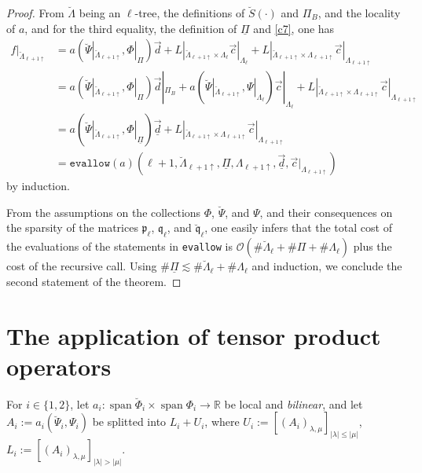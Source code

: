 \documentclass{amsart}
\theoremstyle{definition}
\theoremstyle{remark}
\numberwithin{equation}{section}
\newcommand{\R}{\mathbb R}
\DeclareMathOperator{\Span}{span}
\newcommand{\1}{\mathbb 1}
\begin{document}
\begin{proof}
From  $\breve{\Lambda}$ being an $\ell$-tree, the definitions of $\breve{S}(\cdot)$ and $\Pi_B$, and the locality of $a$, and for the third equality, the definition of $\underline{\Pi}$ and \eqref{c7}, one has
\begin{align*}
f|_{\breve{\Lambda}_{\ell+1 \uparrow}}&=a(\breve{\Psi}|_{\breve{\Lambda}_{\ell+1 \uparrow}},\Phi|_\Pi)\vec{d}
+
L|_{\breve{\Lambda}_{\ell+1 \uparrow} \times \Lambda_\ell}\vec{c}|_{\Lambda_\ell}+
L|_{\breve{\Lambda}_{\ell+1 \uparrow} \times \Lambda_{\ell+1 \uparrow }}\vec{c}|_{\Lambda_{\ell+1\uparrow}}\\
& = a(\breve{\Psi}|_{\breve{\Lambda}_{\ell+1 \uparrow}},\Phi|_\Pi)\vec{d}|_{\Pi_B}+
a(\breve{\Psi}|_{\breve{\Lambda}_{\ell+1 \uparrow}},\Psi|_{\Lambda_\ell})
\vec{c}|_{\Lambda_\ell}+L|_{\breve{\Lambda}_{\ell+1 \uparrow} \times \Lambda_{\ell+1 \uparrow }}\vec{c}|_{\Lambda_{\ell+1\uparrow}}
\\
& = a(\breve{\Psi}|_{\breve{\Lambda}_{\ell+1 \uparrow}},\Phi|_{\underline{\Pi}})\underline{\vec{d}}+L|_{\breve{\Lambda}_{\ell+1 \uparrow} \times \Lambda_{\ell+1 \uparrow }}\vec{c}|_{\Lambda_{\ell+1\uparrow}}\\
& =\mathtt{evallow}(a)(\ell+1, \breve{\Lambda}_{\ell+1\uparrow}, \underline{\Pi}, \Lambda_{\ell+1\uparrow},\underline{\vec{d}}, \vec{c}|_{\Lambda_{\ell+1\uparrow}}) \end{align*}
 by induction.
 
 From the assumptions on the collections $\Phi$, $\breve{\Psi}$, and $\Psi$, and their consequences on the sparsity of the matrices $\mathfrak{p}_{\ell} $, $\mathfrak{q}_\ell$, and $\mathfrak{\breve{q}}_\ell$, one easily infers that the total cost of the evaluations of the statements in \texttt{evallow} is ${\mathcal O}(\# \breve{\Lambda}_\ell+\# \Pi+\# \Lambda_\ell)$ plus the cost of the recursive call. Using 
 $ \# \underline{\Pi} \lesssim \# \breve{\Lambda}_\ell+\# \Lambda_\ell$
 and induction, we conclude the second statement of the theorem.
 \end{proof}

 \newpage
\section{The application of tensor product operators} \label{Sappl-of-tensors}
For $i \in \{1,2\}$, let $a_i\colon \Span \breve{\Phi}_i \times \Span \Phi_i \rightarrow \R$ be local and {\em bilinear}, and 
let $A_i:=a_i(\breve{\Psi}_i,\Psi_i)$ be splitted into $L_i+U_i$, where $U_i:=[(A_i)_{\lambda,\mu}]_{|\lambda| \leq |\mu|}$, $L_i:=[(A_i)_{\lambda,\mu}]_{|\lambda| > |\mu|}$.
\end{document}
